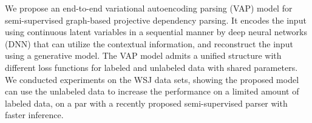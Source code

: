 We propose an end-to-end variational autoencoding parsing (VAP) model for semi-supervised graph-based projective dependency parsing. It encodes the input using continuous latent variables in a sequential manner by deep neural networks (DNN) that can utilize the contextual information, and reconstruct the input using a generative model. The VAP model admits a unified structure with different loss functions for labeled and unlabeled data with shared parameters. We conducted experiments on the WSJ data sets, showing the proposed model can use the unlabeled data to increase the performance on a limited amount of labeled data, on a par with a recently proposed semi-supervised parser with faster inference.
